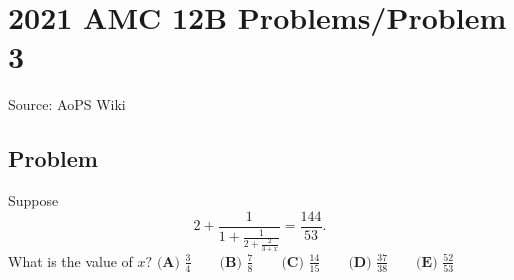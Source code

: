 \documentclass[12pt]{article}
\begin{document}
\section*{{2021 AMC 12B Problems/Problem 3}}
Source: AoPS Wiki

\subsection*{Problem}
Suppose \[2+\frac{1}{1+\frac{1}{2+\frac{2}{3+x}}}=\frac{144}{53}.\] What is the value of $x?$ $\textbf{(A) }\frac34 \qquad \textbf{(B) }\frac78 \qquad \textbf{(C) }\frac{14}{15} \qquad \textbf{(D) }\frac{37}{38} \qquad \textbf{(E) }\frac{52}{53}$
\end{document}
